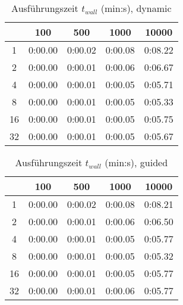 \documentclass[12pt]{article}
\begin{document}
	\begin{table}[H]
	\centering
	\caption[Ausführungszeit $t_{wall}$ (\si{\minute}:\si{\second}), dynamic]{Ausführungszeit $t_{wall}$ (\si{\minute}:\si{\second}), dynamic}
	\begin{tabular}{c|l|l|l|l}
		\hline
		\cellcolor{gray!40}\textbf{\diagbox{Thr.}{N$\times$N}} & \multicolumn{1}{c}{\cellcolor{gray!40}\textbf{100}} & \multicolumn{1}{c}{\cellcolor{gray!40}\textbf{500}} &
		\multicolumn{1}{c}{\cellcolor{gray!40}\textbf{1000}} &
		\multicolumn{1}{c}{\cellcolor{gray!40}\textbf{10000}} \\
		\hline\hline
		1 & 0:00.00 & 0:00.02 & 0:00.08 & 0:08.22 \\\hline
		2 & 0:00.00 & 0:00.01 & 0:00.06 & 0:06.67 \\\hline
		4 & 0:00.00 & 0:00.01 & 0:00.05 & 0:05.71 \\\hline
		8 & 0:00.00 & 0:00.01 & 0:00.05 & 0:05.33 \\\hline
		16 & 0:00.00 & 0:00.01 & 0:00.05 & 0:05.75 \\\hline
		32 & 0:00.00 & 0:00.01 & 0:00.05 & 0:05.67 \\\hline
	\end{tabular}
	\label{tab:twalldyn}
\end{table}

	\begin{table}[H]
	\centering
	\caption[Ausführungszeit $t_{wall}$ (\si{\minute}:\si{\second}), guided]{Ausführungszeit $t_{wall}$ (\si{\minute}:\si{\second}), guided}
	\begin{tabular}{c|l|l|l|l}
		\hline
		\cellcolor{gray!40}\textbf{\diagbox{Thr.}{N$\times$N}} & \multicolumn{1}{c}{\cellcolor{gray!40}\textbf{100}} & \multicolumn{1}{c}{\cellcolor{gray!40}\textbf{500}} &
		\multicolumn{1}{c}{\cellcolor{gray!40}\textbf{1000}} &
		\multicolumn{1}{c}{\cellcolor{gray!40}\textbf{10000}} \\
		\hline\hline
		1 & 0:00.00 & 0:00.02 & 0:00.08 & 0:08.21 \\\hline
		2 & 0:00.00 & 0:00.01 & 0:00.06 & 0:06.50 \\\hline
		4 & 0:00.00 & 0:00.01 & 0:00.05 & 0:05.77 \\\hline
		8 & 0:00.00 & 0:00.01 & 0:00.05 & 0:05.32 \\\hline
		16 & 0:00.00 & 0:00.01 & 0:00.05 & 0:05.77 \\\hline
		32 & 0:00.00 & 0:00.01 & 0:00.06 & 0:05.77 \\\hline
	\end{tabular}
	\label{tab:twallgui}
\end{table}
\end{document}
